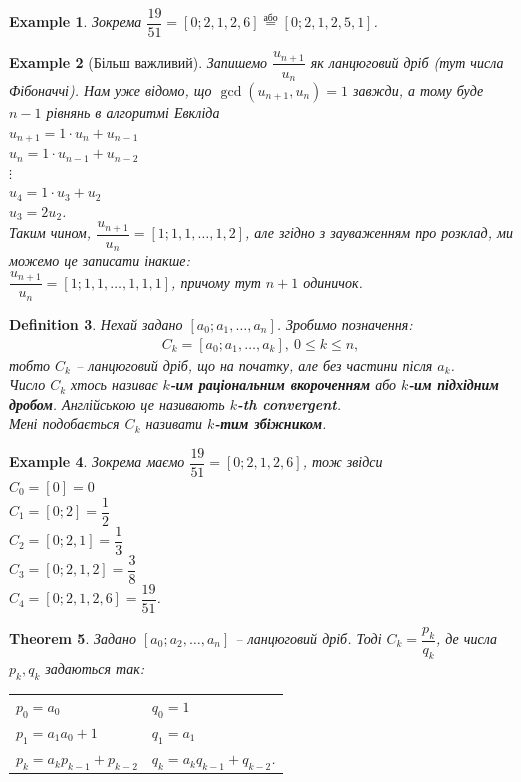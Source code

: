 \documentclass[a4paper, 10pt]{article}
\theoremstyle{theoremdd}
\newtheorem{theorem}{Theorem}[subsection]
\theoremstyle{theoremdd}
\newtheorem{definition}[theorem]{Definition}
\theoremstyle{theoremdd}
\theoremstyle{theoremdd}
\newtheorem{example}[theorem]{Example}
\theoremstyle{theoremdd}
\theoremstyle{theoremdd}
\theoremstyle{theoremdd}
\theoremstyle{theoremdd}
\begin{document}
\begin{example}
Зокрема $\dfrac{19}{51} = [0;2,1,2,6] \overset{\text{або}}{=} [0;2,1,2,5,1]$.
\end{example}

\begin{example}[Більш важливий]
Запишемо $\dfrac{u_{n+1}}{u_n}$  як ланцюговий дріб (тут числа Фібоначчі). Нам уже відомо, що $\gcd(u_{n+1},u_n) = 1$ завжди, а тому буде $n-1$ рівнянь в алгоритмі Евкліда\\
$u_{n+1} = 1 \cdot u_n + u_{n-1}$\\
$u_{n} = 1 \cdot u_{n-1} + u_{n-2}$\\
$\vdots$\\
$u_4 = 1 \cdot u_3 + u_2$\\
$u_3 = 2 u_2$.\\
Таким чином, $\dfrac{u_{n+1}}{u_n} = [1;1,1,\dots,1,2]$, але згідно з зауваженням про розклад, ми можемо це записати інакше:\\
$\dfrac{u_{n+1}}{u_n} = [1;1,1,\dots,1,1,1]$, причому тут $n+1$ одиничок.
\end{example}

\begin{definition}
Нехай задано $[a_0;a_1,\dots,a_n]$. Зробимо позначення:
\begin{align*}
C_k = [a_0;a_1,\dots,a_k],\ 0 \leq k \leq n,
\end{align*}
тобто $C_k$ -- ланцюговий дріб, що на початку, але без частини після $a_k$.\\
Число $C_k$ хтось називає \textbf{$k$-им раціональним вкороченням} або \textbf{$k$-им підхідним дробом}. Англійською це називають \textbf{$k$-th convergent}.\\
Мені подобається $C_k$ називати \textbf{$k$-тим збіжником}.
\end{definition}

\begin{example}
Зокрема маємо $\dfrac{19}{51} = [0;2,1,2,6]$, тож звідси\\
$C_0 = [0] = 0$\\
$C_1 = [0;2] = \dfrac{1}{2}$\\
$C_2 = [0;2,1] = \dfrac{1}{3}$\\
$C_3 = [0;2,1,2] = \dfrac{3}{8}$\\
$C_4 = [0;2,1,2,6] = \dfrac{19}{51}$.
\end{example}

\begin{theorem}
\label{convergent written as rational}
Задано $[a_0;a_2,\dots,a_n]$ -- ланцюговий дріб. Тоді $C_k = \dfrac{p_k}{q_k}$, де числа $p_k,q_k$ задаються так:\\
\begin{tabular}{ll}
$p_0 = a_0$ & $q_0 = 1$\\
$p_1 = a_1a_0 + 1$ & $q_1 = a_1$\\
$p_k = a_kp_{k-1}+p_{k-2}$ & $q_k = a_kq_{k-1} + q_{k-2}$.
\end{tabular}
\end{theorem}
\end{document}
